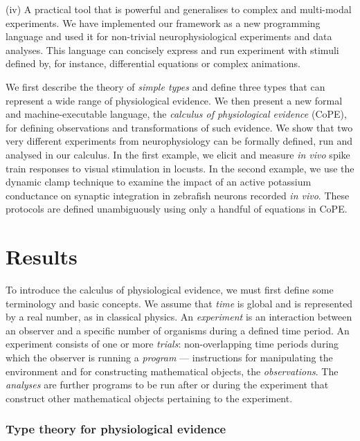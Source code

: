 \documentclass[11pt]{article}
\begin{document}
(iv) A practical tool that is powerful and generalises to complex and
multi-modal experiments. We have implemented our framework as a new
programming language and used it for non-trivial neurophysiological
experiments and data analyses. This language can concisely express and
run experiment with stimuli defined by, for instance, differential
equations or complex animations.

We first describe the theory of \emph{simple types}
\cite{Pierce2002, Hindley2008} and define three types that can represent a wide
range of physiological evidence. We then present a new formal and
machine-executable language, the \emph{calculus of physiological
  evidence} (CoPE), for defining observations and transformations of
such evidence. We show that two very different experiments from
neurophysiology can be formally defined, run and analysed in our
calculus. In the first example, we elicit and measure \emph{in vivo}
spike train responses to visual stimulation in locusts. In the second
example, we use the dynamic clamp technique to examine the impact of
an active potassium conductance on synaptic integration in zebrafish
neurons recorded \emph{in vivo}. These protocols are defined
unambiguously using only a handful of equations in CoPE.


\section*{Results}

To introduce the calculus of physiological evidence, we must first
define some terminology and basic concepts. We assume that \emph{time}
is global and is represented by a real number, as in classical
physics. An \emph{experiment} is an interaction between an observer
and a specific number of organisms during a defined time period. An
experiment consists of one or more \emph{trials}: non-overlapping time
periods during which the observer is running a \emph{program} ---
instructions for manipulating the environment and for constructing
mathematical objects, the \emph{observations}. The \emph{analyses} are
further programs to be run after or during the experiment that
construct other mathematical objects pertaining to the experiment.

\subsubsection*{Type theory for physiological evidence}
\end{document}
